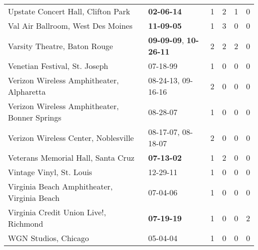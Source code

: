 \begin{longtable}{p{}p{}p{}p{}p{}p{}}
                                           Upstate Concert Hall, Clifton Park &                                       \textbf{02-06-14\textsuperscript{}} &  1 &  2 &  1 &  0 \\
                                            Val Air Ballroom, West Des Moines &                                       \textbf{11-09-05\textsuperscript{}} &  1 &  3 &  0 &  0 \\
                                                 Varsity Theatre, Baton Rouge &  \textbf{09-09-09\textsuperscript{}}, \textbf{10-26-11\textsuperscript{}} &  2 &  2 &  2 &  0 \\
                                                Venetian Festival, St. Joseph &                                                07-18-99\textsuperscript{} &  1 &  0 &  0 &  0 \\
                                    Verizon Wireless Amphitheater, Alpharetta &                    08-24-13\textsuperscript{}, 09-16-16\textsuperscript{} &  2 &  0 &  0 &  0 \\
                                Verizon Wireless Amphitheater, Bonner Springs &                                                08-28-07\textsuperscript{} &  1 &  0 &  0 &  0 \\
                                         Verizon Wireless Center, Noblesville &                    08-17-07\textsuperscript{}, 08-18-07\textsuperscript{} &  2 &  0 &  0 &  0 \\
                                           Veterans Memorial Hall, Santa Cruz &                                       \textbf{07-13-02\textsuperscript{}} &  1 &  2 &  0 &  0 \\
                                                     Vintage Vinyl, St. Louis &                                                12-29-11\textsuperscript{} &  1 &  0 &  0 &  0 \\
                                  Virginia Beach Amphitheater, Virginia Beach &                                                07-04-06\textsuperscript{} &  1 &  0 &  0 &  0 \\
                                        Virginia Credit Union Live!, Richmond &                                       \textbf{07-19-19\textsuperscript{}} &  1 &  0 &  0 &  2 \\
                                                         WGN Studios, Chicago &                                                05-04-04\textsuperscript{} &  1 &  0 &  0 &  0 \\

\end{longtable}
